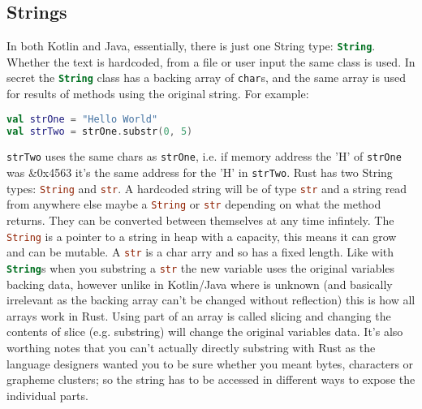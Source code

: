 \documentclass[a4paper,11pt]{article}
\begin{document}
\subsection{Strings}
In both Kotlin and Java, essentially, there is just one String type: \lstinline[language=Kotlin]{String}. Whether the text is hardcoded, from a file or user input the same class is used. In secret the \lstinline[language=Kotlin]{String} class has a backing array of \lstinline[language=Kotlin]{char}s, and the same array is used for results of methods using the original string. For example:
\begin{lstlisting}[language=Kotlin,frame=single]
val strOne = "Hello World"
val strTwo = strOne.substr(0, 5)
\end{lstlisting}
 \lstinline{strTwo} uses the same chars as  \lstinline{strOne}, i.e. if memory address the 'H' of \lstinline{strOne} was \&0x4563 it's the same address for the 'H' in \lstinline{strTwo}.
\newline
\newline
Rust has two String types: \lstinline[language=Rust]{String} and \lstinline[language=Rust]{str}. A hardcoded string will be of type \lstinline[language=Rust]{str} and a string read from anywhere else maybe a \lstinline[language=Rust]{String} or \lstinline[language=Rust]{str} depending on what the method returns. They can be converted between themselves at any time infintely.
\newline
The \lstinline[language=Rust]{String} is a pointer to a string in heap with a capacity, this means it can grow and can be mutable. A \lstinline[language=Rust]{str} is a char arry and so has a fixed length.
\newline
Like with \lstinline[language=Kotlin]{String}s when you substring a \lstinline[language=Rust]{str} the new variable uses the original variables backing data, however unlike in Kotlin/Java where is unknown (and basically irrelevant as the backing array can't be changed without reflection) this is how all arrays work in Rust. Using part of an array is called slicing and changing the contents of slice (e.g. substring) will change the original variables data.
\newline
\newline
It's also worthing notes that you can't actually directly substring with Rust as the language designers wanted you to be sure whether you meant bytes, characters or grapheme clusters; so the string has to be accessed in different ways to expose the individual parts.
\end{document}
